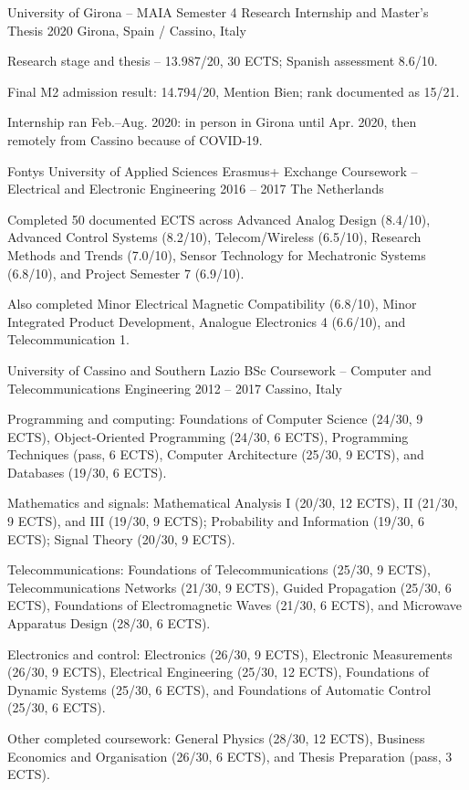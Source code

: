\begin{cventries}
\cventry
  {University of Girona -- MAIA Semester 4}
  {Research Internship and Master's Thesis}
  {2020}
  {Girona, Spain / Cassino, Italy}
  {
    \begin{cvitems}
      \item {Research stage and thesis -- 13.987/20, 30 ECTS; Spanish assessment 8.6/10.}
      \item {Final M2 admission result: 14.794/20, Mention Bien; rank documented as 15/21.}
      \item {Internship ran Feb.--Aug. 2020: in person in Girona until Apr. 2020, then remotely from Cassino because of COVID-19.}
    \end{cvitems}
  }

\cventry
  {Fontys University of Applied Sciences}
  {Erasmus+ Exchange Coursework -- Electrical and Electronic Engineering}
  {2016 -- 2017}
  {The Netherlands}
  {
    \begin{cvitems}
      \item {Completed 50 documented ECTS across Advanced Analog Design (8.4/10), Advanced Control Systems (8.2/10), Telecom/Wireless (6.5/10), Research Methods and Trends (7.0/10), Sensor Technology for Mechatronic Systems (6.8/10), and Project Semester 7 (6.9/10).}
      \item {Also completed Minor Electrical Magnetic Compatibility (6.8/10), Minor Integrated Product Development, Analogue Electronics 4 (6.6/10), and Telecommunication 1.}
    \end{cvitems}
  }

\cventry
  {University of Cassino and Southern Lazio}
  {BSc Coursework -- Computer and Telecommunications Engineering}
  {2012 -- 2017}
  {Cassino, Italy}
  {
    \begin{cvitems}
      \item {Programming and computing: Foundations of Computer Science (24/30, 9 ECTS), Object-Oriented Programming (24/30, 6 ECTS), Programming Techniques (pass, 6 ECTS), Computer Architecture (25/30, 9 ECTS), and Databases (19/30, 6 ECTS).}
      \item {Mathematics and signals: Mathematical Analysis I (20/30, 12 ECTS), II (21/30, 9 ECTS), and III (19/30, 9 ECTS); Probability and Information (19/30, 6 ECTS); Signal Theory (20/30, 9 ECTS).}
      \item {Telecommunications: Foundations of Telecommunications (25/30, 9 ECTS), Telecommunications Networks (21/30, 9 ECTS), Guided Propagation (25/30, 6 ECTS), Foundations of Electromagnetic Waves (21/30, 6 ECTS), and Microwave Apparatus Design (28/30, 6 ECTS).}
      \item {Electronics and control: Electronics (26/30, 9 ECTS), Electronic Measurements (26/30, 9 ECTS), Electrical Engineering (25/30, 12 ECTS), Foundations of Dynamic Systems (25/30, 6 ECTS), and Foundations of Automatic Control (25/30, 6 ECTS).}
      \item {Other completed coursework: General Physics (28/30, 12 ECTS), Business Economics and Organisation (26/30, 6 ECTS), and Thesis Preparation (pass, 3 ECTS).}
    \end{cvitems}
  }


\end{cventries}
